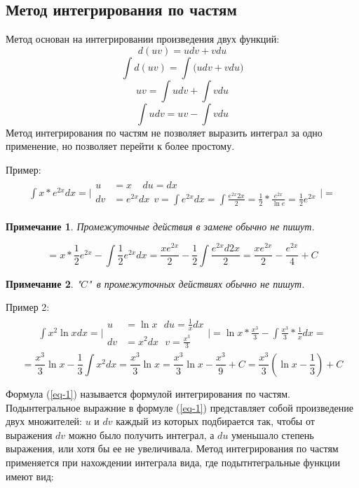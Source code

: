 \documentclass[12pt,a4paper]{article}
\newtheorem*{remark}{Примечание}
\begin{document}
\subsection{Метод интегрирования по частям}
Метод основан на интегрировании произведения двух функций:
\[
    d(uv) = udv + vdu
\]
\[
\int d(uv) = \int \big( udv + vdu \big)
\]
\[
uv = \int udv + \int vdu
\]
\begin{equation}
\label{eq-1}
\int udv = uv - \int vdu
\end{equation}
Метод интегрирования по частям не позволяет выразить интеграл за
одно применение, но позволяет перейти к более простому.

Пример:
\begin{align*}
\int x * e^{2x} dx = \Bigg|
\begin{split}
u & = x\ \ \ \ \ du = dx \\
dv & = e^{2x} dx \ \ v = \int e^{2x} dx =
\int \frac{e^{2x} 2x}{2} = \frac{1}{2} * \frac{e^{2x}}{ \ln e} =
\frac{1}{2}e^{2x}
\end{split}
\Bigg| =
\end{align*}
\begin{remark}
Промежуточные действия в замене обычно не пишут.
\end{remark}
\[
= x * \frac{1}{2} e^{2x} - \int \frac{1}{2} e^{2x} dx =
\frac{x e^{2x}}{2} - \frac{1}{2} \int \frac{e^{2x} d2x}{2} =
\frac{xe^{2x}}{2} - \frac{e^{2x}}{4} + C
\]
\begin{remark}
"$C$"\ в промежуточных действиях обычно не пишут.
\end{remark}

Пример 2:
\begin{align*}
\int x^2 \ln x dx = \Bigg|
\begin{split}
u & = \ln x \ \ \ du = \frac{1}{x}dx\\
dv & = x^2 dx \ \ \ v = \frac{x^3}{3}
\end{split}
\Bigg| =
\ln x * \frac{x^3}{3} - \int \frac{x^3}{3} * \frac{1}{x} dx =
\end{align*}
\[
= \frac{x^3}{3} \ln x - \frac{1}{3} \int x^2 dx = \frac{x^3}{3} \ln x
= \frac{x^3}{3} \ln x - \frac{x^3}{9} + C = \frac{x^3}{3}
(\ln x - \frac{1}{3}) + C
\]

Формула (\ref{eq-1}) называется формулой интегрирования по частям.
Подынтегральное выражние в формуле (\ref{eq-1}) представляет собой
произведение двух множителей: $u$ и $dv$ каждый из которых
подбирается так, чтобы от выражения $dv$ можно было получить
интеграл, а $du$ уменьшало степень выражения, или хотя бы ее не
увеличивала.
Метод интегрирования по частям применяется при нахождении интеграла
вида, где подытнтегральные функции имеют вид:
\end{document}
